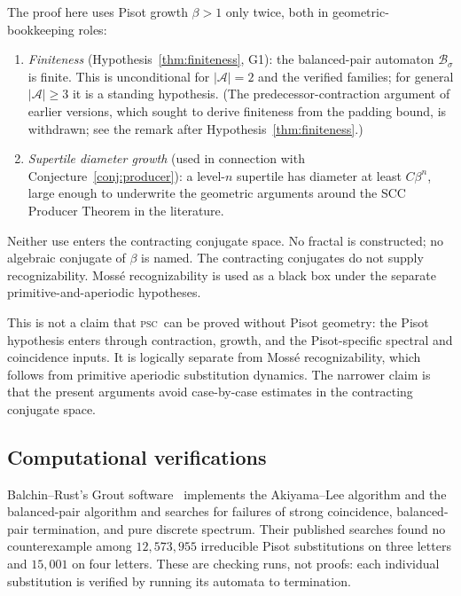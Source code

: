 \documentclass[11pt]{article}
\theoremstyle{plain}
\theoremstyle{definition}
\theoremstyle{remark}
\newcommand{\PSC}{\textsc{psc}}
\newcommand{\PDS}{pure discrete spectrum}
\newcommand{\A}{\mathcal{A}}
\newcommand{\B}{\mathcal{B}}
\begin{document}
The proof here uses Pisot growth $\beta>1$ only twice, both in geometric-bookkeeping roles:
\begin{enumerate}[label=(\roman*)]
\item \emph{Finiteness} (Hypothesis~\ref{thm:finiteness}, G1): the balanced-pair automaton $\B_\sigma$ is finite. This is unconditional for $|\A|=2$ and the verified families; for general $|\A|\ge3$ it is a standing hypothesis. (The predecessor-contraction argument of earlier versions, which sought to derive finiteness from the padding bound, is withdrawn; see the remark after Hypothesis~\ref{thm:finiteness}.)
\item \emph{Supertile diameter growth} (used in connection with Conjecture~\ref{conj:producer}): a level-$n$ supertile has diameter at least $C\beta^n$, large enough to underwrite the geometric arguments around the SCC Producer Theorem in the literature.
\end{enumerate}

Neither use enters the contracting conjugate space. No fractal is constructed; no algebraic conjugate of $\beta$ is named. The contracting conjugates do not supply recognizability. Moss\'e recognizability is used as a black box under the separate primitive-and-aperiodic hypotheses.

This is not a claim that \PSC\ can be proved without Pisot geometry: the Pisot hypothesis enters through contraction, growth, and the Pisot-specific spectral and coincidence inputs. It is logically separate from Moss\'e recognizability, which follows from primitive aperiodic substitution dynamics. The narrower claim is that the present arguments avoid case-by-case estimates in the contracting conjugate space.

\subsection{Computational verifications}\label{sec:comp-verif}

Balchin--Rust's Grout software~\cite{Balchin} implements the Akiyama--Lee algorithm and the balanced-pair algorithm and searches for failures of strong coincidence, balanced-pair termination, and \PDS. Their published searches found no counterexample among $12{,}573{,}955$ irreducible Pisot substitutions on three letters and $15{,}001$ on four letters. These are checking runs, not proofs: each individual substitution is verified by running its automata to termination.
\end{document}
